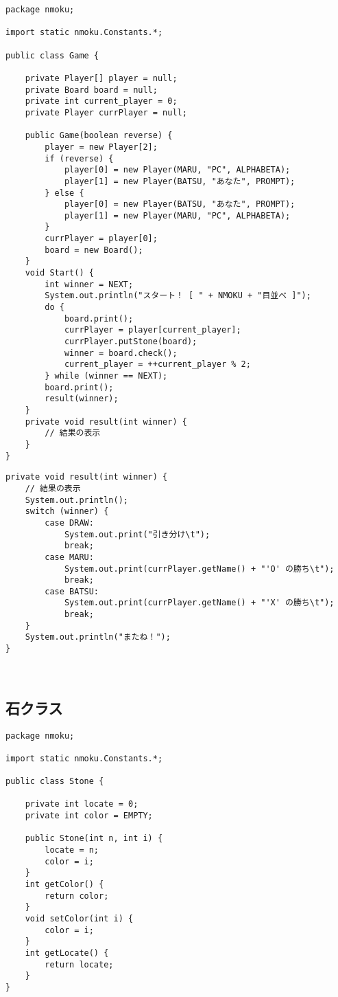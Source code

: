 \documentclass[uplatex,a4paper,11pt,oneside,openany]{jsbook}
\begin{document}
\begin{lstlisting}[caption=ゲームクラス：N目並べ,label=prog24]
package nmoku;

import static nmoku.Constants.*;

public class Game {

    private Player[] player = null;
    private Board board = null;
    private int current_player = 0;
    private Player currPlayer = null;

    public Game(boolean reverse) {
        player = new Player[2];
        if (reverse) {
            player[0] = new Player(MARU, "PC", ALPHABETA);
            player[1] = new Player(BATSU, "あなた", PROMPT);
        } else {
            player[0] = new Player(BATSU, "あなた", PROMPT);
            player[1] = new Player(MARU, "PC", ALPHABETA);
        }
        currPlayer = player[0];
        board = new Board();
    }
    void Start() {
        int winner = NEXT;
        System.out.println("スタート！ [ " + NMOKU + "目並べ ]");
        do {
            board.print();
            currPlayer = player[current_player];
            currPlayer.putStone(board);
            winner = board.check();
            current_player = ++current_player % 2;
        } while (winner == NEXT);
        board.print();
        result(winner);
    }
    private void result(int winner) {
        // 結果の表示
    }
}
\end{lstlisting}

\begin{lstlisting}[caption=結果の表示：ゲームクラス内：N目並べ,label=prog25]
private void result(int winner) {
    // 結果の表示
    System.out.println();
    switch (winner) {
        case DRAW:
            System.out.print("引き分け\t");
            break;
        case MARU:
            System.out.print(currPlayer.getName() + "'O' の勝ち\t");
            break;
        case BATSU:
            System.out.print(currPlayer.getName() + "'X' の勝ち\t");
            break;
    }
    System.out.println("またね！");
}
\end{lstlisting}
\
\subsection{石クラス}

\begin{lstlisting}[caption=石クラス：N目並べ,label=prog26]
package nmoku;

import static nmoku.Constants.*;

public class Stone {

    private int locate = 0;
    private int color = EMPTY;

    public Stone(int n, int i) {
        locate = n;
        color = i;
    }
    int getColor() {
        return color;
    }
    void setColor(int i) {
        color = i;
    }
    int getLocate() {
        return locate;
    }
}
\end{lstlisting}
\end{document}
